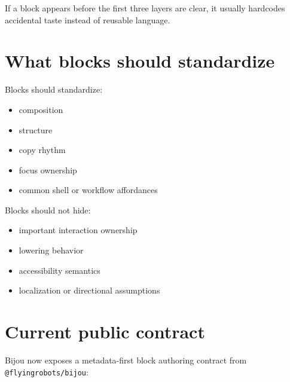 If a block appears before the first three layers are clear, it usually hardcodes accidental taste instead of reusable language.

\section{What blocks should standardize}\label{record-018-what-blocks-should-standardize}

Blocks should standardize:

\begin{itemize}
\tightlist
\item
  composition
\item
  structure
\item
  copy rhythm
\item
  focus ownership
\item
  common shell or workflow affordances
\end{itemize}

Blocks should not hide:

\begin{itemize}
\tightlist
\item
  important interaction ownership
\item
  lowering behavior
\item
  accessibility semantics
\item
  localization or directional assumptions
\end{itemize}

\section{Current public contract}\label{record-018-current-public-contract}

Bijou now exposes a metadata-first block authoring contract from \texttt{@\allowbreak{}f\allowbreak{}l\allowbreak{}y\allowbreak{}i\allowbreak{}n\allowbreak{}g\allowbreak{}r\allowbreak{}o\allowbreak{}b\allowbreak{}o\allowbreak{}t\allowbreak{}s\allowbreak{}/\allowbreak{}b\allowbreak{}i\allowbreak{}j\allowbreak{}o\allowbreak{}u}:

